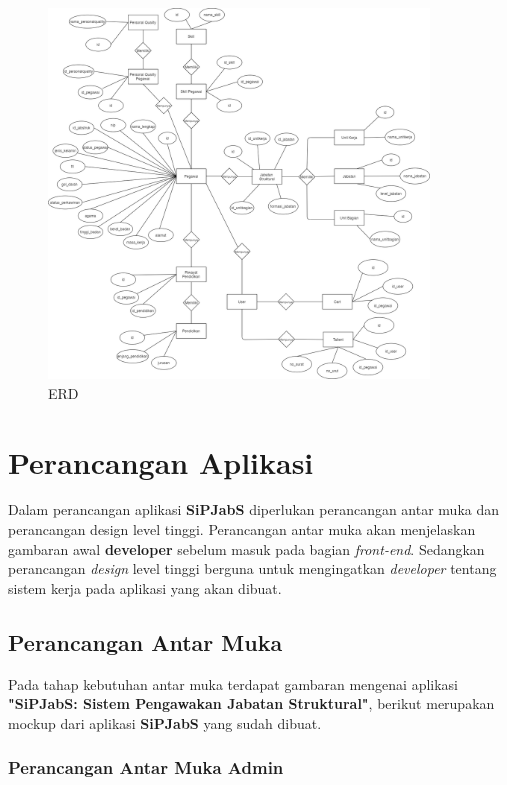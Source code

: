 \begin{figure}
	\centering
	\includegraphics[width=0.9\textwidth]
	{pics/diagram/erd.png}
	\caption{ERD}
	\label{fig:32}
\end{figure}

\section{Perancangan Aplikasi}
Dalam perancangan aplikasi \textbf{SiPJabS} diperlukan perancangan antar muka dan perancangan design level tinggi. Perancangan antar muka akan menjelaskan gambaran awal  \textbf{developer} sebelum masuk pada bagian \textit{front-end}.  Sedangkan perancangan \textit{design} level tinggi berguna untuk mengingatkan \textit{developer} tentang sistem kerja pada aplikasi yang akan dibuat.


\subsection{Perancangan Antar Muka}
Pada tahap kebutuhan antar muka terdapat gambaran mengenai aplikasi \textbf{"SiPJabS: Sistem Pengawakan Jabatan Struktural"}, berikut merupakan mockup dari aplikasi \textbf{SiPJabS} yang sudah dibuat.

\subsubsection{Perancangan Antar Muka Admin}

